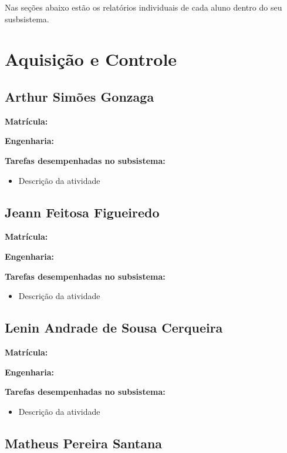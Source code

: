 Nas seções abaixo estão os relatórios individuais de cada aluno dentro do seu susbsistema.

\section{Aquisição e Controle}


\subsection{Arthur Simões Gonzaga}

\textbf{Matrícula:}

\textbf{Engenharia:}

\textbf{Tarefas desempenhadas no subsistema:}

\begin{itemize}
\item Descrição da atividade
\end{itemize}


\subsection{Jeann Feitosa Figueiredo}

\textbf{Matrícula:}

\textbf{Engenharia:}

\textbf{Tarefas desempenhadas no subsistema:}

\begin{itemize}
\item Descrição da atividade
\end{itemize}


\subsection{Lenin Andrade de Sousa Cerqueira}

\textbf{Matrícula:}

\textbf{Engenharia:}

\textbf{Tarefas desempenhadas no subsistema:}

\begin{itemize}
\item Descrição da atividade
\end{itemize}


\subsection{Matheus Pereira Santana}

